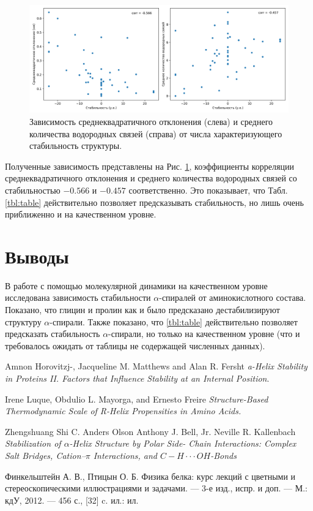 \documentclass[
11pt,%
tightenlines,%
twoside,%
onecolumn,%
nofloats,%
nobibnotes,%
nofootinbib,%
superscriptaddress,%
noshowpacs,%
centertags]%
{revtex4}
\begin{document}
\begin{figure}[h]
	\centering
	\includegraphics[width=\textwidth]{stability}
	\caption{Зависимость среднеквадратичного отклонения (слева) 
		и среднего количества водородных связей (справа) от числа характеризующего стабильность структуры.}
	\label{pic:stability}
		
\end{figure}

Полученные зависимость представлены на Рис. \ref{pic:stability}, 
коэффициенты корреляции среднеквадратичного отклонения и среднего количества водородных связей 
со стабильностью $-0.566$ и $-0.457$ соответственно. 
Это показывает, что Табл. \ref{tbl:table} действительно позволяет предсказывать стабильность,
но лишь очень приближенно и на качественном уровне.

\section{Выводы}
В работе с помощью молекулярной динамики на качественном уровне исследована 
зависимость стабильности $\alpha$-спиралей от аминокислотного состава.
Показано, что глицин и пролин как и было предсказано дестабилизируют структуру $\alpha$-спирали.
Также показано, что \ref{tbl:table} действительно позволяет предсказать стабильность $\alpha$-спирали,
но только на качественном уровне (что и требовалось ожидать от таблицы не содержащей численных данных).


%
%

\begin{thebibliography}{99}
	  Amnon Horovitzj-, Jacqueline M. Matthews and Alan R. Fersht \textit{a-Helix Stability in Proteins II. Factors that Influence Stability at an Internal Position}. 
	
	  Irene Luque, Obdulio L. Mayorga, and Ernesto Freire
	\textit{Structure-Based Thermodynamic Scale of R-Helix Propensities in Amino Acids.}
	
	  Zhengshuang Shi C. Anders Olson Anthony J. Bell, Jr. Neville R. Kallenbach
	\textit{Stabilization of $\alpha$-Helix Structure by Polar Side- Chain Interactions: Complex Salt Bridges, Cation–$\pi$ Interactions, and $C - H \cdot \cdot \cdot O H$-Bonds} 
	
	
	
Финкельштейн А. В., Птицын О. Б. Физика белка: 
курс лекций с цветными и стереоскопическими иллюстрациями и задачами. — 3-е изд., испр. и доп. — М.: кдУ, 2012. —
456 с., [32] c. ил.: ил.


\end{thebibliography}
\end{document}
